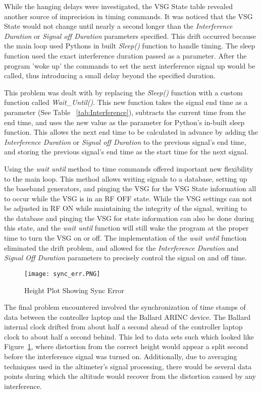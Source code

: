  While the hanging delays were investigated, the VSG State table revealed another source of imprecision in timing commands. It was noticed that the VSG State would not change until nearly a second longer than the \textit{Interference Duration} or \textit{Signal off Duration} parameters specified. This drift occurred because the main loop used Pythons in built \textit{Sleep()} function to handle timing. The sleep function used the exact interference duration passed as a parameter. After the program 'woke up' the commands to set the next interference signal up would be called, thus introducing a small delay beyond the specified duration. 
 
 This problem was dealt with by replacing the \textit{Sleep()} function with a custom function called \textit{Wait\_Until()}. This new function takes the signal end time as a parameter (See Table ~\ref{tab:Interference}), subtracts the current time from the end time, and uses the new value as the parameter for Python's in-built sleep function. This allows the next end time to be calculated in advance by adding the \textit{Interference Duration} or \textit{Signal off Duration} to the previous signal's end time, and storing the previous signal's end time as the start time for the next signal. %

Using the \textit{wait until} method to time commands offered important new flexibility to the main loop. This method allows writing signals to a database, setting up the baseband generators, and pinging the VSG for the VSG State information all to occur while the VSG is in an RF OFF state. While the VSG settings can not be adjusted in RF ON while maintaining the integrity of the signal, writing to the database and pinging the VSG for state information can also be done during this state, and the \textit{wait until} function will still wake the program at the proper time to turn the VSG on or off. The implementation of the \textit{wait until} function eliminated the drift problem, and allowed for the \textit{Interference Duration} and \textit{Signal Off Duration} parameters to precisely control the signal on and off time. 

\begin{figure}[ht]
\centering
\texttt{[image: sync\_err.PNG]}
\caption{Height Plot Showing Sync Error}

\label{fig:sync}

\end{figure}
The final problem encountered involved the synchronization of time stamps of data between the controller laptop and the Ballard ARINC device. The Ballard internal clock drifted from about half a second ahead of the controller laptop clock to about half a second behind. This led to data sets such which looked like Figure~\ref{fig:sync}, where distortion from the correct height would appear a split second before the interference signal was turned on. Additionally, due to averaging techniques used in the altimeter's signal processing, there would be several data points during which the altitude would recover from the distortion caused by any interference. 



